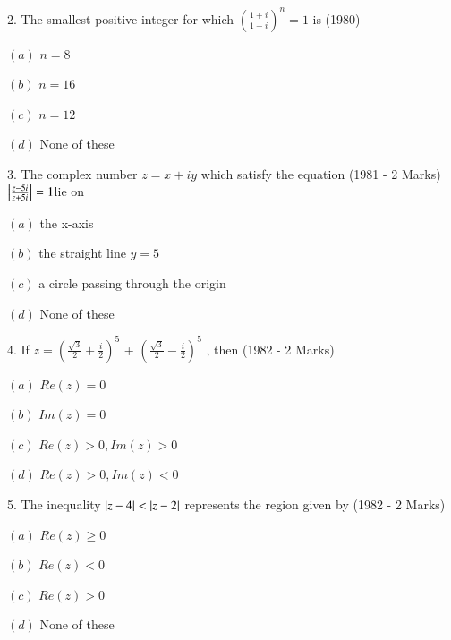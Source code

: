 \documentclass[journal,12pt,twocolumn]{IEEEtran}
\theoremstyle{remark}
\begin{document}
 2. The smallest positive integer for which
    $(\frac{1+i}{1-i})^n = 1$ is  \hfill(1980)    
\begin{multicols}{2}
\item $(a)$ $n=8$
\item $(b)$ $n=16$
\item $(c)$ $n=12$
\item $(d)$ None of these
\end{multicols}
 3. The complex number $z= x+iy$ which satisfy the equation \hfill(1981 - 2 Marks)
     $\left\vert\frac{z-5i}{z+5i}\right\vert = 1 $lie on 
\begin{multicols}{2}
\item $(a)$ the x-axis
\item $(b)$ the straight line $y=5$
\item $(c)$ a circle passing through the origin 
\item $(d)$ None of these
 \end{multicols}
 4. If $z=(\frac{\sqrt{3}}{2} + \frac{i}{2})^5$ + $(\frac{\sqrt{3}}{2} - \frac{i}{2})^5$ , then \hfill(1982 - 2 Marks)
\begin{multicols}{2}
\item $(a)$ $Re(z)=0$
\item $(b)$ $Im(z)=0$
\item $(c)$ $Re(z)>0, Im(z)>0$
\item $(d)$ $Re(z)>0, Im(z)<0$
\end{multicols}
 5. The inequality $\left\vert z-4\right\vert<\left\vert z-2\right\vert$ represents the region given by \hfill(1982 - 2 Marks)
\begin{multicols}{2}
\item $(a)$ $Re(z)\ge0$
\item $(b)$ $Re(z)<0$ 
\item $(c)$ $Re(z)>0$ 
\item $(d)$ None of these
\end{multicols}
\end{document}
